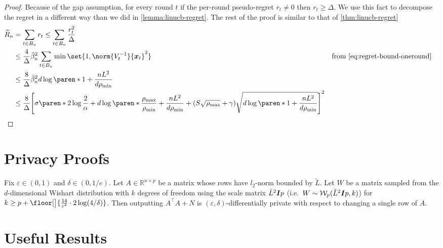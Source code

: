 \documentclass{article}
\renewcommand{\vec}[1]{\bm{#1}}
\newcommand{\inv}[1]{#1^{-1}}
\newcommand{\Real}{\mathds{R}}
\DeclarePairedDelimiter{\paren}()
\DeclarePairedDelimiter{\brck}{[}{]}
\DeclarePairedDelimiter{\floor}\lfloor\rfloor
\providecommand\transp{\top}
\let\transpsymbol\transp
\renewcommand{\transp}[1]{#1^\transpsymbol}
\newcommand{\Wishart}{\mathcal{W}}
\newcommand{\Eye}[1][]{\bm{I}\notblank{#1}{_{{#1}\times{#1}}}{}}
\newcommand{\XtX}[1]{\transp{#1}{#1}}
\begin{document}
\ThmLinUCBGapRegret*

\begin{proof}
  Because of the gap assumption, for every round $t$ if the per-round
  pseudo-regret $r_t \neq 0$ then $r_t \ge \Delta$.  We use this fact
  to decompose the regret in a different way than we did in
  \cref{lemma:linucb-regret}.  The rest of the proof is similar to
  that of \cref{thm:linucb-regret}
  \begin{align*}
    \widehat R_n
    &= \sum_{t\in B_n} r_t \le \sum_{t\in B_n} \frac{r_t^2}{\Delta} \\
    &\le \frac{4}{\Delta} \bar\beta_n^2 \sum_{t\in B_n} \min\set{1, \norm{\inv{V_t}}{\vec x_t}^2}
    &\text{from~\eqref{eq:regret-bound-oneround}} \\
    &\le \frac{8}{\Delta} \bar\beta_n^2d\log\paren*{1+\frac{nL^2}{d\rho_{\min}}} \\
    &\le \frac{8}{\Delta} \brck*{\sigma\paren*{2\log\frac{2}{\alpha}
      + d\log\paren*{\frac{\rho_{\max}}{\rho_{\min}} + \frac{nL^2}{d\rho_{\min}}}}
      + (S\sqrt{\rho_{\max}}+\gamma)\sqrt{d\log\paren*{1+\frac{nL^2}{d\rho_{\min}}}}}^2
    &&\qedhere
  \end{align*}

\end{proof}

\section{Privacy Proofs}

\begin{theorem}%
  \label{thm:wishart-dp}%
  Fix $\varepsilon\in(0,1)$ and $\delta\in(0,1/e)$.  Let
  $A\in\Real^{n\times p}$ be a matrix whose rows have $l_2$-norm
  bounded by $\tilde L$.  Let $W$ be a matrix sampled from the
  $d$-dimensional Wishart distribution with $k$ degrees of freedom
  using the scale matrix $\tilde L^2\Eye{p}$ (i.e.\
  $W \sim \Wishart_p(\tilde L^2\Eye{p}, k)$) for
  $k \ge p + \floor[\big]{\frac{14}{\varepsilon^2}\cdot 2\log(4/\delta)}$.
  Then outputting $\XtX{A} + N$ is
  $(\varepsilon,\delta)$-differentially private with respect to
  changing a single row of $A$.
\end{theorem}

\section{Useful Results}
\end{document}
